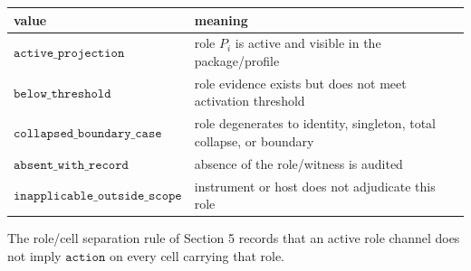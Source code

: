 \documentclass[11pt]{article}
\theoremstyle{definition}
\begin{document}
\begin{longtable}[]{@{}ll@{}}
\toprule
\begin{minipage}[b]{0.33\columnwidth}\raggedright
value\strut
\end{minipage} & \begin{minipage}[b]{0.61\columnwidth}\raggedright
meaning\strut
\end{minipage}\tabularnewline
\midrule
\endhead
\begin{minipage}[t]{0.33\columnwidth}\raggedright
\(\texttt{active\_projection}\)\strut
\end{minipage} & \begin{minipage}[t]{0.61\columnwidth}\raggedright
role \(P_{i}\) is active and visible in the package/profile\strut
\end{minipage}\tabularnewline
\begin{minipage}[t]{0.33\columnwidth}\raggedright
\(\texttt{below\_threshold}\)\strut
\end{minipage} & \begin{minipage}[t]{0.61\columnwidth}\raggedright
role evidence exists but does not meet activation threshold\strut
\end{minipage}\tabularnewline
\begin{minipage}[t]{0.33\columnwidth}\raggedright
\(\texttt{collapsed\_boundary\_case}\)\strut
\end{minipage} & \begin{minipage}[t]{0.61\columnwidth}\raggedright
role degenerates to identity, singleton, total collapse, or boundary\strut
\end{minipage}\tabularnewline
\begin{minipage}[t]{0.33\columnwidth}\raggedright
\(\texttt{absent\_with\_record}\)\strut
\end{minipage} & \begin{minipage}[t]{0.61\columnwidth}\raggedright
absence of the role/witness is audited\strut
\end{minipage}\tabularnewline
\begin{minipage}[t]{0.33\columnwidth}\raggedright
\(\texttt{inapplicable\_outside\_scope}\)\strut
\end{minipage} & \begin{minipage}[t]{0.61\columnwidth}\raggedright
instrument or host does not adjudicate this role\strut
\end{minipage}\tabularnewline
\bottomrule
\end{longtable}

The role/cell separation rule of Section 5 records that an active role channel does not imply \(\texttt{action}\) on every cell carrying that role.
\end{document}
